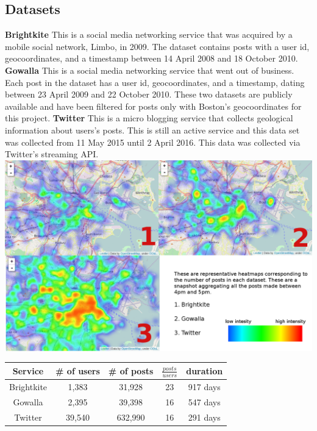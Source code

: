\documentclass{lposter}
\theoremstyle{plain}
\theoremstyle{definition}
\newcommand{\red}[1]{{\color{red}#1}}
\newcommand{\green}[1]{{\color{green}#1}}
\newcommand{\blue}[1]{{\color{blue}#1}}
\begin{document}
\begin{poster}
\section{Datasets}
\blue{\textbf{Brightkite}} This is a social media networking service that was acquired by a mobile social network, Limbo, in 2009. The dataset contains posts with a user id, geocoordinates, and a timestamp between 14 April 2008 and 18 October 2010.
\green{\textbf{Gowalla}} This is a social media networking service that went out of business. Each post in the dataset has a user id, geocoordinates, and a timestamp, dating between 23 April 2009 and 22 October 2010.
These two datasets are publicly available and have been filtered for posts only with Boston's geocoordinates for this project.
\red{\textbf{Twitter}} This is a micro blogging service that collects geological information about users's posts. This is still an active service and this data set was collected from 11 May 2015 until 2 April 2016. This data was collected via Twitter's streaming API.
\includegraphics[scale=0.5]{heatmap.png}
\begin{tabular}{c | c | c | c | c }
Service & \# of users & \# of posts & $\frac{posts}{users}$ & duration\\
\hline
Brightkite & 1,383 & 31,928 & 23 & 917 days\\
Gowalla & 2,395 & 39,398 & 16 & 547 days\\
Twitter & 39,540 & 632,990 & 16 & 291 days
\end{tabular}

\end{poster}
\end{document}
